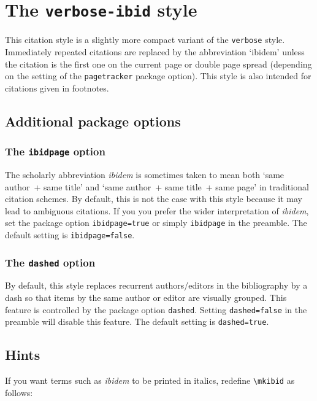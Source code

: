 \documentclass[a4paper]{article}
\newcommand{\cmd}[1]{\texttt{\textbackslash #1}}
\begin{document}
\section*{The \texttt{verbose-ibid} style}

This citation style is a slightly more compact variant of the
\texttt{verbose} style. Immediately repeated citations are replaced
by the abbreviation `ibidem' unless the citation is the first one on
the current page or double page spread (depending on the setting of
the \texttt{pagetracker} package option). This style is also
intended for citations given in footnotes.

\subsection*{Additional package options}

\subsubsection*{The \texttt{ibidpage} option}

The scholarly abbreviation \emph{ibidem} is sometimes taken to mean
both `same author~+ same title' and `same author~+ same title~+ same
page' in traditional citation schemes. By default, this is not the
case with this style because it may lead to ambiguous citations. If
you you prefer the wider interpretation of \emph{ibidem}, set the
package option \texttt{ibidpage=true} or simply \texttt{ibidpage} in
the preamble. The default setting is \texttt{ibidpage=false}.

\subsubsection*{The \texttt{dashed} option}

By default, this style replaces recurrent authors/editors in the
bibliography by a dash so that items by the same author or editor
are visually grouped. This feature is controlled by the package
option \texttt{dashed}. Setting \texttt{dashed=false} in the
preamble will disable this feature. The default setting is
\texttt{dashed=true}.

\subsection*{Hints}

If you want terms such as \emph{ibidem} to be printed in italics,
redefine \cmd{mkibid} as follows:
\end{document}
